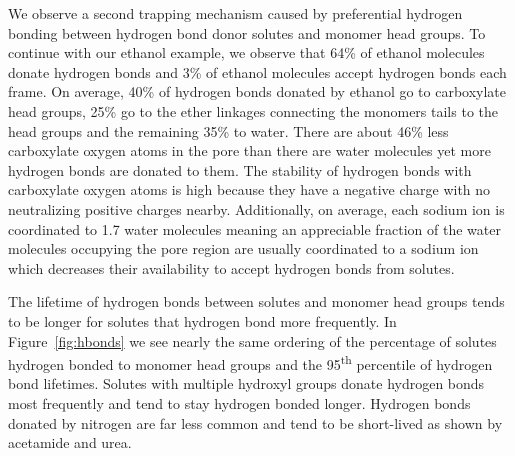 \documentclass[journal=jpcbfk,manuscript=article]{achemso}
\begin{document}
  We observe a second trapping mechanism caused by preferential hydrogen 
  bonding between hydrogen bond donor solutes and monomer head groups. To 
  continue with our ethanol example, we observe that 64\% of ethanol 
  molecules donate hydrogen bonds  %
  and 3\% of ethanol molecules accept hydrogen bonds each frame. On average, 40\%
  of hydrogen bonds donated by ethanol go to carboxylate %
  head groups, 25\% go to the ether linkages connecting the monomers tails to the 
  head groups and the remaining 35\% to water. There are about 46\% less  %
  carboxylate oxygen atoms in the pore than there are water molecules yet more
  hydrogen bonds are donated to them. The stability of hydrogen bonds with 
  carboxylate oxygen atoms is high because they have a negative charge
  with no neutralizing positive charges nearby. Additionally, on average, 
  each sodium ion is coordinated to 1.7 water molecules meaning an appreciable
  fraction of the water molecules occupying the pore region are usually 
  coordinated to a sodium ion which decreases their availability to accept 
  hydrogen bonds from solutes.
  
  The lifetime of hydrogen bonds between solutes and monomer head groups tends to 
  be longer for solutes that hydrogen bond more frequently. In Figure~\ref{fig:hbonds}
  we see nearly the same ordering of the percentage of solutes hydrogen bonded to
  monomer head groups and the 95\textsuperscript{th} percentile of hydrogen bond 
  lifetimes. Solutes with multiple hydroxyl groups donate hydrogen bonds most 
  frequently and tend to stay hydrogen bonded longer. Hydrogen bonds donated by
  nitrogen are far less common and tend to be short-lived as shown by acetamide
  and urea.
\end{document}
